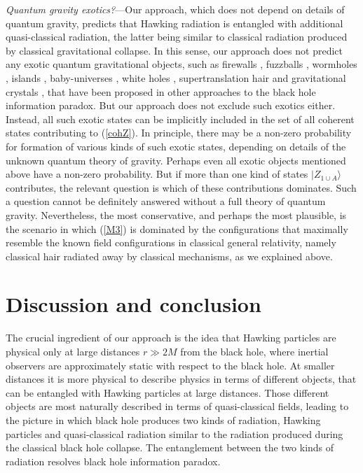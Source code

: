 \documentclass[12pt]{article}
\begin{document}
{\it Quantum gravity exotics?}---Our approach, which does not depend on details of quantum gravity, 
predicts that Hawking radiation is entangled with additional quasi-classical radiation, the latter being similar
to classical radiation produced by classical gravitational collapse. In this sense, our approach does not predict 
any exotic quantum gravitational objects, such as firewalls \cite{AMPS}, fuzzballs \cite{mathur}, wormholes \cite{er=epr},
islands \cite{island}, baby-universes \cite{gid}, white holes \cite{rovelli_tunnel}, supertranslation hair \cite{softhair}
and gravitational crystals \cite{nik_cryst},
that have been proposed in other approaches to the black hole information paradox. 
But our approach does not exclude such exotics either. Instead, all such exotic states can be implicitly included 
in the set of all coherent states contributing to (\ref{cohZ}). In principle, there may be a non-zero probability 
for formation of various kinds of such exotic states, depending on details of the unknown quantum theory of gravity.
Perhaps even all exotic objects mentioned above have a non-zero probability. But if more than one kind of 
states $|Z_{1\cup A}\rangle$ contributes, the relevant question is which of these contributions dominates. 
Such a question cannot be definitely answered without a full theory of quantum gravity. Nevertheless,
the most conservative, and perhaps the most plausible, is the scenario in which (\ref{M3}) is dominated 
by the configurations that maximally resemble the known field configurations in classical general relativity, 
namely classical hair radiated away by classical mechanisms, as we explained above.

\section{Discussion and conclusion}

The crucial ingredient of our approach is the idea that Hawking particles are physical 
only at large distances $r\gg 2M$ from the black hole, where inertial observers are approximately static with respect 
to the black hole. At smaller distances it is more physical to describe physics in terms of different objects, 
that can be entangled with Hawking particles at large distances. Those different objects are most naturally described in terms 
of quasi-classical fields, leading to the picture in which black hole produces two kinds of radiation,
Hawking particles and quasi-classical radiation similar to the radiation produced during the classical black hole collapse.
The entanglement between the two kinds of radiation resolves black hole information paradox. 
\end{document}
